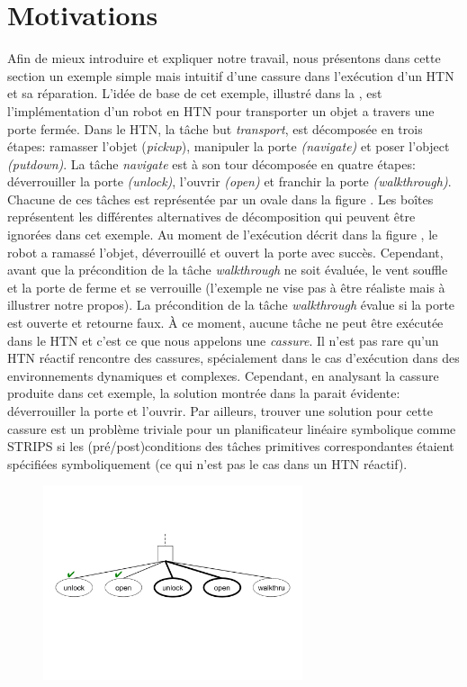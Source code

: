 \documentclass[a4paper,twoside,french]{article}
\begin{document}
		\section{Motivations}
		Afin de mieux introduire et expliquer notre travail, nous présentons dans cette section un exemple simple mais intuitif d'une cassure dans l'exécution d'un HTN et sa réparation. L'idée de base de cet exemple, illustré dans la  , est l'implémentation d'un robot en HTN pour transporter un objet a travers une porte fermée. Dans le HTN, la tâche but {\em transport}, est décomposée en trois étapes: ramasser l'objet ({\em pickup}), manipuler la porte {\em(navigate)} et poser l'object {\em(putdown)}. La tâche {\em navigate} est à son tour décomposée en quatre étapes: déverrouiller  la porte {\em(unlock)}, l'ouvrir {\em(open)} et franchir la porte {\em(walkthrough)}. Chacune de ces tâches est représentée par un ovale dans la figure . Les boîtes représentent les différentes alternatives de décomposition qui peuvent être ignorées dans cet exemple. Au moment de l'exécution décrit dans la figure , le robot a ramassé l'objet, déverrouillé et ouvert la porte avec succès. Cependant, avant que la précondition de la tâche {\em walkthrough} ne soit évaluée, le vent souffle et la porte de ferme et se verrouille (l'exemple ne vise pas à être réaliste mais à illustrer notre propos). La précondition de la tâche {\em walkthrough} évalue si la porte est ouverte et retourne faux. À ce moment, aucune tâche ne peut être exécutée dans le HTN et c'est ce que nous appelons une {\em cassure}. Il n'est pas rare qu'un HTN réactif rencontre des cassures, spécialement dans le cas d'exécution dans des environnements dynamiques et complexes. Cependant, en analysant la cassure produite dans cet exemple, la solution montrée dans la  parait évidente: déverrouiller la porte et l'ouvrir. Par ailleurs, trouver une solution pour cette cassure est un problème triviale pour un planificateur linéaire symbolique comme STRIPS si les (pré/post)conditions des tâches primitives correspondantes étaient spécifiées symboliquement (ce qui n'est pas le cas dans un HTN réactif).
		
			\begin{figure}[t]
				\centerline{\includegraphics[width=3in]{figs/recover}}
				\vskip 8pt
			\end{figure}
	
\end{document}
